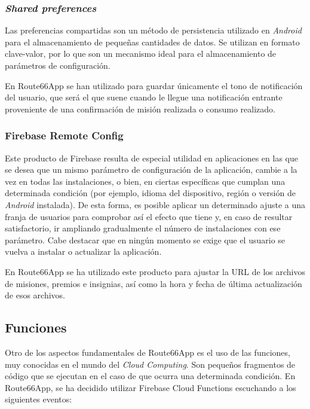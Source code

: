 \documentclass[twoside]{report}
\begin{document}
\subsubsection{\textit{Shared preferences}}

Las preferencias compartidas son un método de persistencia utilizado en \textit{Android} para el almacenamiento de pequeñas cantidades de datos. Se utilizan en formato clave-valor, por lo que son un mecanismo ideal para el almacenamiento de parámetros de configuración.

En Route66App se han utilizado para guardar únicamente el tono de notificación del usuario, que será el que suene cuando le llegue una notificación entrante proveniente de una confirmación de misión realizada o consumo realizado.

\subsubsection{Firebase Remote Config}

Este producto de Firebase resulta de especial utilidad en aplicaciones en las que se desea que un mismo parámetro de configuración de la aplicación, cambie a la vez en todas las instalaciones, o bien, en ciertas específicas que cumplan una determinada condición (por ejemplo, idioma del dispositivo, región o versión de \textit{Android} instalada). De esta forma, es posible aplicar un determinado ajuste a una franja de usuarios para comprobar así el efecto que tiene y, en caso de resultar satisfactorio, ir ampliando gradualmente el número de instalaciones con ese parámetro. Cabe destacar que en ningún momento se exige que el usuario se vuelva a instalar o actualizar la aplicación.

En Route66App se ha utilizado este producto para ajustar la URL de los archivos de misiones, premios e insignias, así como la hora y fecha de última actualización de esos archivos.

\subsection{Funciones}

Otro de los aspectos fundamentales de Route66App es el uso de las funciones, muy conocidas en el mundo del \textit{Cloud Computing}. Son pequeños fragmentos de código que se ejecutan en el caso de que ocurra una determinada condición. En Route66App, se ha decidido utilizar Firebase Cloud Functions escuchando a los siguientes eventos:
\end{document}
